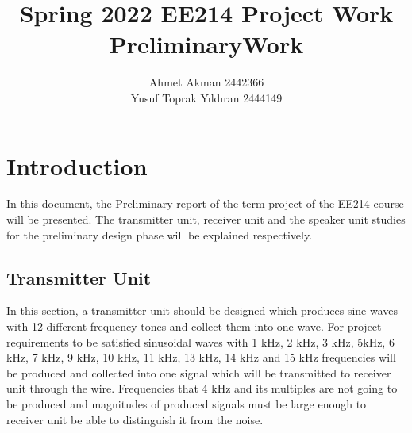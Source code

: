 \documentclass[letterpaper,12pt]{article}
\begin{document}
\thispagestyle{empty}

\title{Spring 2022 EE214 Project Work  \protect\\ PreliminaryWork }
\author{Ahmet Akman 2442366 \protect\\ Yusuf Toprak Yıldıran 2444149 }
\maketitle
\section{Introduction}
\vspace{-4mm}
In this document, the Preliminary report of the term project of the EE214 course will be presented. The transmitter unit, receiver unit and the speaker unit studies for the preliminary design phase will be explained respectively.
\vspace{-4mm}
\subsection{Transmitter Unit}
In this section, a transmitter unit should be designed which produces sine waves with 12 different frequency tones and collect them into one wave. For project requirements to be satisfied sinusoidal waves with 1 kHz, 2 kHz, 3 kHz, 5kHz, 6 kHz, 7 kHz, 9 kHz, 10 kHz, 11 kHz, 13 kHz, 14 kHz and 15 kHz frequencies will be produced and collected into one signal which will be transmitted to receiver unit through the wire. Frequencies that 4 kHz and its multiples are not going to be produced and magnitudes of produced signals must be large enough to receiver unit be able to distinguish it from the noise.
\end{document}
